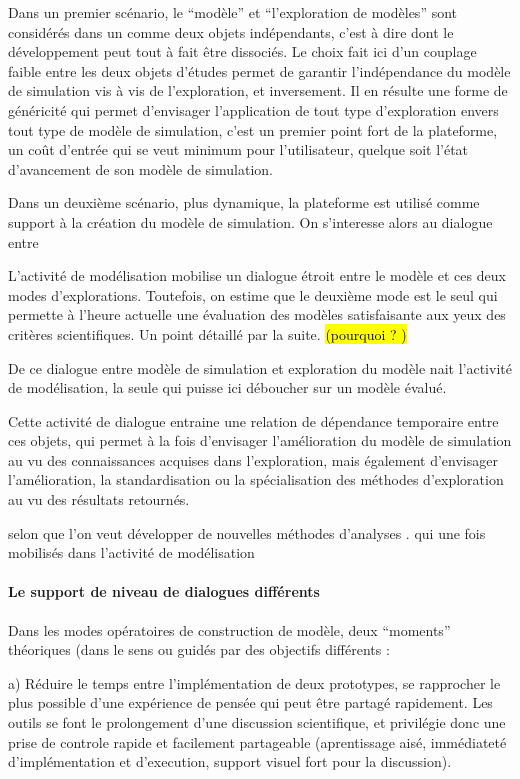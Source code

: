 Dans un premier scénario, le \enquote{modèle} et \enquote{l'exploration de modèles} sont considérés dans un  comme deux objets indépendants, c'est à dire dont le développement peut tout à fait être dissociés. Le choix fait ici d'un couplage faible entre les deux objets d'études permet de garantir l'indépendance du modèle de simulation vis à vis de l'exploration, et inversement. Il en résulte une forme de généricité qui permet d'envisager l'application de tout type d'exploration envers tout type de modèle de simulation, c'est un premier point fort de la plateforme, un coût d'entrée qui se veut minimum pour l'utilisateur, quelque soit l'état d'avancement de son modèle de simulation.

Dans un deuxième scénario, plus dynamique, la plateforme est utilisé comme support à la création du modèle de simulation. On s'interesse alors au dialogue entre 

L'activité de modélisation mobilise un dialogue étroit entre le modèle et ces deux modes d'explorations. Toutefois, on estime que le deuxième mode est le seul qui permette à l'heure actuelle une évaluation des modèles satisfaisante aux yeux des critères scientifiques. Un point détaillé par la suite. \hl{(pourquoi ? )}

De ce dialogue entre modèle de simulation et exploration du modèle nait l'activité de modélisation, la seule qui puisse ici déboucher sur un modèle évalué.

Cette activité de dialogue entraine une relation de dépendance temporaire entre ces objets, qui permet à la fois d'envisager l'amélioration du modèle de simulation au vu des connaissances acquises dans l'exploration, mais également d'envisager l'amélioration, la standardisation ou la spécialisation des méthodes d'exploration au vu des résultats retournés. 

 selon que l'on veut développer de nouvelles méthodes d'analyses . qui une fois mobilisés dans l'activité de modélisation 

\paragraph{Le support de niveau de dialogues différents}

Dans les modes opératoires de construction de modèle, deux \enquote{moments} théoriques (dans le sens ou guidés par des objectifs différents : 

a) Réduire le temps entre l'implémentation de deux prototypes, se rapprocher le plus possible d'une expérience de pensée qui peut être partagé rapidement. Les outils se font le prolongement d'une discussion scientifique, et privilégie donc une prise de controle rapide et facilement partageable (aprentissage aisé, immédiateté d'implémentation et d'execution, support visuel fort pour la discussion).

